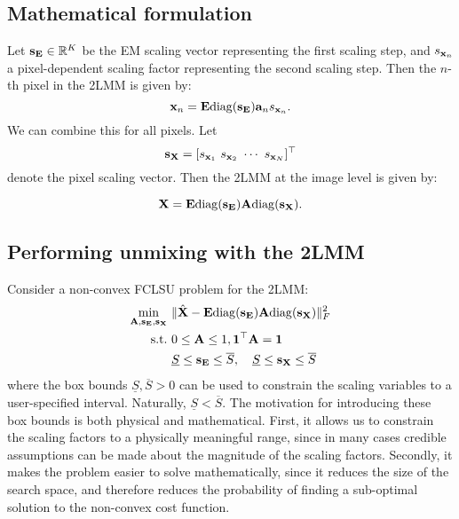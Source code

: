 \subsection{Mathematical formulation}

Let $\mathbf{s}_{\mathbf{E}} \in \mathbb{R}^K$ be the EM scaling vector representing the first scaling step, and $s_{\mathbf{x}_n}$ a pixel-dependent scaling factor representing the second scaling step. Then the $n$-th pixel in the 2LMM is given by:
\begin{equation*}
    \mathbf{x}_n = \mathbf{E}\mathrm{diag}(\mathbf{s}_{\mathbf{E}})\mathbf{a}_n s_{\mathbf{x}_n}.
\end{equation*}
We can combine this for all pixels. Let 
\[
\mathbf{s}_{\mathbf{X}} = [s_{\mathbf{x}_1}~s_{\mathbf{x}_2}~\cdots~s_{\mathbf{x}_N}]^\top
\]
denote the pixel scaling vector. Then the 2LMM at the image level is given by:

\begin{equation} \label{eq: 2lmm cost function}
    \mathbf{X} = \mathbf{E}\mathrm{diag}(\mathbf{s}_{\mathbf{E}})\mathbf{A}\mathrm{diag}(\mathbf{s}_{\mathbf{X}}).
\end{equation}



\subsection{Performing unmixing with the 2LMM}
Consider a non-convex FCLSU problem for the 2LMM:
\begin{equation}
\begin{aligned}
    \min_{\mathbf{A}, \mathbf{s}_{\mathbf{E}}, \mathbf{s}_{\mathbf{X}}} &~\|\Hat{\mathbf{X}} - \mathbf{E} \mathrm{diag}(\mathbf{s}_{\mathbf{E}})\mathbf{A}\mathrm{diag}(\mathbf{s}_{\mathbf{X}})\|_F^2 \\
    \text{s.t.} &~ 0 \leq \mathbf{A} \leq 1, \mathbf{1}^\top \mathbf{A} = \mathbf{1} \\
    &~ \underline{S} \leq \mathbf{s}_{\mathbf{E}} \leq \overline{S}, \quad \underline{S} \leq \mathbf{s}_{\mathbf{X}} \leq \overline{S}
\end{aligned}
\end{equation}
where the box bounds $\underline{S}, \overline{S} > 0$ can be used to constrain the scaling variables to a user-specified interval. Naturally, $\underline{S} < \overline{S}$. The motivation for introducing these box bounds is both physical and mathematical. First, it allows us to constrain the scaling factors to a physically meaningful range, since in many cases credible assumptions can be made about the magnitude of the scaling factors. Secondly, it makes the problem easier to solve mathematically, since it reduces the size of the search space, and therefore reduces the probability of finding a sub-optimal solution to the non-convex cost function.

